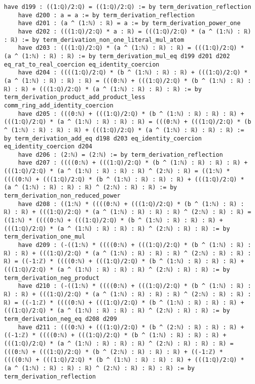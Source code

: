 \documentclass{article}
\begin{document}
\begin{tcolorbox}[colback=white!10, width=\linewidth]
\begin{lstlisting}[language=Lean4]
    have d199 : ((1:ℚ)/2:ℚ) = ((1:ℚ)/2:ℚ) := by term_derivation_reflection
    have d200 : a = a := by term_derivation_reflection
    have d201 : (a ^ (1:ℕ) : ℝ) = a := by term_derivation_power_one
    have d202 : (((1:ℚ)/2:ℚ) * a : ℝ) = (((1:ℚ)/2:ℚ) * (a ^ (1:ℕ) : ℝ) : ℝ) := by term_derivation_non_one_literal_mul_atom
    have d203 : (((1:ℚ)/2:ℚ) * (a ^ (1:ℕ) : ℝ) : ℝ) = (((1:ℚ)/2:ℚ) * (a ^ (1:ℕ) : ℝ) : ℝ) := by term_derivation_mul_eq d199 d201 d202 eq_rat_to_real_coercion eq_identity_coercion
    have d204 : ((((1:ℚ)/2:ℚ) * (b ^ (1:ℕ) : ℝ) : ℝ) + (((1:ℚ)/2:ℚ) * (a ^ (1:ℕ) : ℝ) : ℝ) : ℝ) = (((0:ℕ) + (((1:ℚ)/2:ℚ) * (b ^ (1:ℕ) : ℝ) : ℝ) : ℝ) + (((1:ℚ)/2:ℚ) * (a ^ (1:ℕ) : ℝ) : ℝ) : ℝ) := by term_derivation_product_add_product_less comm_ring_add_identity_coercion
    have d205 : (((0:ℕ) + (((1:ℚ)/2:ℚ) * (b ^ (1:ℕ) : ℝ) : ℝ) : ℝ) + (((1:ℚ)/2:ℚ) * (a ^ (1:ℕ) : ℝ) : ℝ) : ℝ) = (((0:ℕ) + (((1:ℚ)/2:ℚ) * (b ^ (1:ℕ) : ℝ) : ℝ) : ℝ) + (((1:ℚ)/2:ℚ) * (a ^ (1:ℕ) : ℝ) : ℝ) : ℝ) := by term_derivation_add_eq d198 d203 eq_identity_coercion eq_identity_coercion d204
    have d206 : (2:ℕ) = (2:ℕ) := by term_derivation_reflection
    have d207 : ((((0:ℕ) + (((1:ℚ)/2:ℚ) * (b ^ (1:ℕ) : ℝ) : ℝ) : ℝ) + (((1:ℚ)/2:ℚ) * (a ^ (1:ℕ) : ℝ) : ℝ) : ℝ) ^ (2:ℕ) : ℝ) = ((1:ℕ) * ((((0:ℕ) + (((1:ℚ)/2:ℚ) * (b ^ (1:ℕ) : ℝ) : ℝ) : ℝ) + (((1:ℚ)/2:ℚ) * (a ^ (1:ℕ) : ℝ) : ℝ) : ℝ) ^ (2:ℕ) : ℝ) : ℝ) := by term_derivation_non_reduced_power
    have d208 : ((1:ℕ) * ((((0:ℕ) + (((1:ℚ)/2:ℚ) * (b ^ (1:ℕ) : ℝ) : ℝ) : ℝ) + (((1:ℚ)/2:ℚ) * (a ^ (1:ℕ) : ℝ) : ℝ) : ℝ) ^ (2:ℕ) : ℝ) : ℝ) = ((1:ℕ) * ((((0:ℕ) + (((1:ℚ)/2:ℚ) * (b ^ (1:ℕ) : ℝ) : ℝ) : ℝ) + (((1:ℚ)/2:ℚ) * (a ^ (1:ℕ) : ℝ) : ℝ) : ℝ) ^ (2:ℕ) : ℝ) : ℝ) := by term_derivation_one_mul
    have d209 : (-((1:ℕ) * ((((0:ℕ) + (((1:ℚ)/2:ℚ) * (b ^ (1:ℕ) : ℝ) : ℝ) : ℝ) + (((1:ℚ)/2:ℚ) * (a ^ (1:ℕ) : ℝ) : ℝ) : ℝ) ^ (2:ℕ) : ℝ) : ℝ) : ℝ) = ((-1:ℤ) * ((((0:ℕ) + (((1:ℚ)/2:ℚ) * (b ^ (1:ℕ) : ℝ) : ℝ) : ℝ) + (((1:ℚ)/2:ℚ) * (a ^ (1:ℕ) : ℝ) : ℝ) : ℝ) ^ (2:ℕ) : ℝ) : ℝ) := by term_derivation_neg_product
    have d210 : (-((1:ℕ) * ((((0:ℕ) + (((1:ℚ)/2:ℚ) * (b ^ (1:ℕ) : ℝ) : ℝ) : ℝ) + (((1:ℚ)/2:ℚ) * (a ^ (1:ℕ) : ℝ) : ℝ) : ℝ) ^ (2:ℕ) : ℝ) : ℝ) : ℝ) = ((-1:ℤ) * ((((0:ℕ) + (((1:ℚ)/2:ℚ) * (b ^ (1:ℕ) : ℝ) : ℝ) : ℝ) + (((1:ℚ)/2:ℚ) * (a ^ (1:ℕ) : ℝ) : ℝ) : ℝ) ^ (2:ℕ) : ℝ) : ℝ) := by term_derivation_neg_eq d208 d209
    have d211 : (((0:ℕ) + (((1:ℚ)/2:ℚ) * (b ^ (2:ℕ) : ℝ) : ℝ) : ℝ) + ((-1:ℤ) * ((((0:ℕ) + (((1:ℚ)/2:ℚ) * (b ^ (1:ℕ) : ℝ) : ℝ) : ℝ) + (((1:ℚ)/2:ℚ) * (a ^ (1:ℕ) : ℝ) : ℝ) : ℝ) ^ (2:ℕ) : ℝ) : ℝ) : ℝ) = (((0:ℕ) + (((1:ℚ)/2:ℚ) * (b ^ (2:ℕ) : ℝ) : ℝ) : ℝ) + ((-1:ℤ) * ((((0:ℕ) + (((1:ℚ)/2:ℚ) * (b ^ (1:ℕ) : ℝ) : ℝ) : ℝ) + (((1:ℚ)/2:ℚ) * (a ^ (1:ℕ) : ℝ) : ℝ) : ℝ) ^ (2:ℕ) : ℝ) : ℝ) : ℝ) := by term_derivation_reflection

\end{lstlisting}
\end{tcolorbox}
\end{document}
